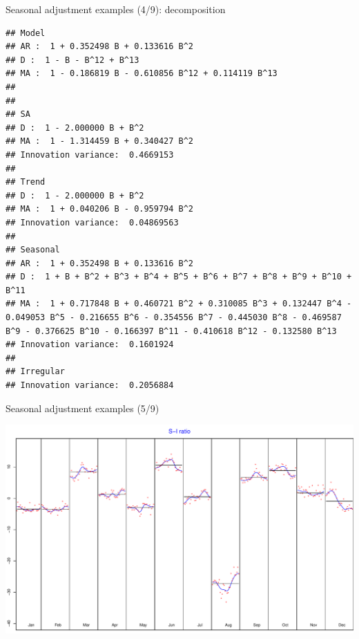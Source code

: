 \documentclass[10pt,xcolor=table,color={dvipsnames,usenames},ignorenonframetext,usepdftitle=false,french]{beamer}
\newenvironment{Shaded}{\begin{snugshade}}{\end{snugshade}}
\newcommand{\KeywordTok}[1]{\textcolor[rgb]{0.13,0.29,0.53}{\textbf{#1}}}
\newcommand{\NormalTok}[1]{#1}
\newcommand{\OperatorTok}[1]{\textcolor[rgb]{0.81,0.36,0.00}{\textbf{#1}}}
\begin{document}
\begin{frame}[fragile]{Seasonal adjustment examples (4/9):
decomposition}
\protect\hypertarget{seasonal-adjustment-examples-49-decomposition}{}

\footnotesize

\begin{Shaded}
\end{Shaded}

\begin{verbatim}
## Model
## AR :  1 + 0.352498 B + 0.133616 B^2 
## D :  1 - B - B^12 + B^13 
## MA :  1 - 0.186819 B - 0.610856 B^12 + 0.114119 B^13 
## 
## 
## SA
## D :  1 - 2.000000 B + B^2 
## MA :  1 - 1.314459 B + 0.340427 B^2 
## Innovation variance:  0.4669153 
## 
## Trend
## D :  1 - 2.000000 B + B^2 
## MA :  1 + 0.040206 B - 0.959794 B^2 
## Innovation variance:  0.04869563 
## 
## Seasonal
## AR :  1 + 0.352498 B + 0.133616 B^2 
## D :  1 + B + B^2 + B^3 + B^4 + B^5 + B^6 + B^7 + B^8 + B^9 + B^10 + B^11 
## MA :  1 + 0.717848 B + 0.460721 B^2 + 0.310085 B^3 + 0.132447 B^4 - 0.049053 B^5 - 0.216655 B^6 - 0.354556 B^7 - 0.445030 B^8 - 0.469587 B^9 - 0.376625 B^10 - 0.166397 B^11 - 0.410618 B^12 - 0.132580 B^13 
## Innovation variance:  0.1601924 
## 
## Irregular
## Innovation variance:  0.2056884
\end{verbatim}

\end{frame}

\begin{frame}[fragile]{Seasonal adjustment examples (5/9)}
\protect\hypertarget{seasonal-adjustment-examples-59}{}

\begin{Shaded}
\end{Shaded}

\includegraphics{img/markdown-unnamed-chunk-8-1.pdf}

\end{frame}
\end{document}

